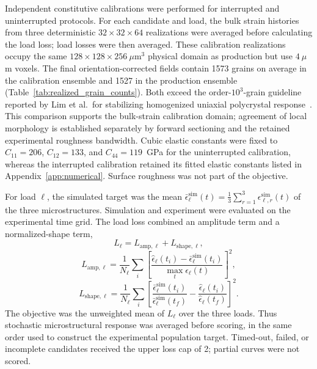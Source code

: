 \documentclass[final,12pt]{cas-sc}
\begin{document}
Independent
constitutive calibrations were performed for interrupted and uninterrupted
protocols. For each candidate and load, the bulk strain histories from three
deterministic $32\times32\times64$ realizations were averaged before
calculating the load loss; load losses were then averaged. These calibration
realizations occupy the same $128\times128\times256~\mu\mathrm{m}^3$
physical domain as production but use $4~\mu$m voxels. The final
orientation-corrected fields contain 1573 grains on average in the
calibration ensemble and 1527 in the production ensemble
(Table~\ref{tab:realized_grain_counts}). Both exceed the order-$10^3$-grain
guideline reported by Lim et al.\ for stabilizing homogenized uniaxial
polycrystal response~\cite{lim2019rve}. This comparison supports the
bulk-strain calibration domain; agreement of local morphology is established
separately by forward sectioning and the retained experimental roughness
bandwidth. Cubic elastic constants were fixed to $C_{11}=206$,
$C_{12}=133$, and $C_{44}=119$~GPa for the uninterrupted calibration,
whereas the interrupted calibration retained its fitted elastic constants
listed in Appendix~\ref{app:numerical}. Surface roughness was not part of the
objective.

For load $\ell$, the simulated target was the mean
$\bar{\epsilon}^{\mathrm{sim}}_\ell(t)=
\frac{1}{3}\sum_{r=1}^{3}\epsilon^{\mathrm{sim}}_{\ell,r}(t)$ of the three
microstructures. Simulation and experiment were evaluated on the
experimental time grid. The load loss combined an amplitude term and a
normalized-shape term,
\begin{equation}
L_\ell=L_{\mathrm{amp},\ell}+L_{\mathrm{shape},\ell},
\end{equation}
\begin{equation}
L_{\mathrm{amp},\ell}=
\frac{1}{N_\ell}\sum_i
\left[
\frac{\widehat{\epsilon}_\ell(t_i)
-\bar{\epsilon}^{\mathrm{sim}}_\ell(t_i)}
{\max_t\widehat{\epsilon}_\ell(t)}
\right]^2,
\end{equation}
\begin{equation}
L_{\mathrm{shape},\ell}=
\frac{1}{N_\ell}\sum_i
\left[
\frac{\bar{\epsilon}^{\mathrm{sim}}_\ell(t_i)}
{\bar{\epsilon}^{\mathrm{sim}}_\ell(t_f)}
-\frac{\widehat{\epsilon}_\ell(t_i)}
{\widehat{\epsilon}_\ell(t_f)}
\right]^2.
\end{equation}
The objective was the unweighted mean of $L_\ell$ over the three loads.
Thus stochastic microstructural response was averaged before scoring, in the
same order used to construct the experimental population target. Timed-out,
failed, or incomplete candidates received the upper loss cap of 2; partial
curves were not scored.
\end{document}
